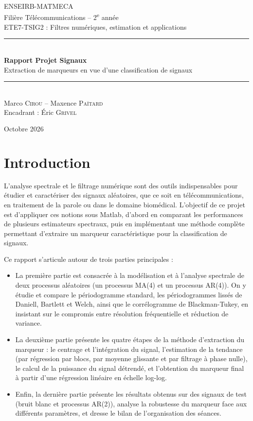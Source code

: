 \documentclass[11pt,a4paper]{article}
\begin{document}
\begin{titlepage}
  \centering
  {\large ENSEIRB-MATMECA}\\[0.2cm]
  {\large Filière Télécommunications -- 2\textsuperscript{e} année}\\[0.2cm]
  {\large ETE7-TSIG2 : Filtres numériques, estimation et applications}\\[3cm]

  \rule{\linewidth}{0.5pt}\\[0.4cm]
  {\LARGE\bfseries Rapport Projet Signaux}\\[0.3cm]
  {\large Extraction de marqueurs en vue d'une classification de signaux}\\
  \rule{\linewidth}{0.5pt}\\[3cm]

  {\large Marco \textsc{Cirou} \quad -- \quad Maxence \textsc{Païtard}}\\[1cm]
  {\large Encadrant : Éric \textsc{Grivel}}

  \vfill
  {\large Octobre 2026}
\end{titlepage}

\tableofcontents
\newpage

\section{Introduction}

L'analyse spectrale et le filtrage numérique sont des outils indispensables pour étudier et caractériser des signaux aléatoires, que ce soit en télécommunications, en traitement de la parole ou dans le domaine biomédical. L'objectif de ce projet est d'appliquer ces notions sous Matlab, d'abord en comparant les performances de plusieurs estimateurs spectraux, puis en implémentant une méthode complète permettant d'extraire un marqueur caractéristique pour la classification de signaux.

Ce rapport s'articule autour de trois parties principales :
\begin{itemize}
    \item La première partie est consacrée à la modélisation et à l'analyse spectrale de deux processus aléatoires (un processus MA(4) et un processus AR(4)). On y étudie et compare le périodogramme standard, les périodogrammes lissés de Daniell, Bartlett et Welch, ainsi que le corrélogramme de Blackman-Tukey, en insistant sur le compromis entre résolution fréquentielle et réduction de variance.
    \item La deuxième partie présente les quatre étapes de la méthode d'extraction du marqueur : le centrage et l'intégration du signal, l'estimation de la tendance (par régression par blocs, par moyenne glissante et par filtrage à phase nulle), le calcul de la puissance du signal détrendé, et l'obtention du marqueur final à partir d'une régression linéaire en échelle log-log.
    \item Enfin, la dernière partie présente les résultats obtenus sur des signaux de test (bruit blanc et processus AR(2)), analyse la robustesse du marqueur face aux différents paramètres, et dresse le bilan de l'organisation des séances.
\end{itemize}
\end{document}
